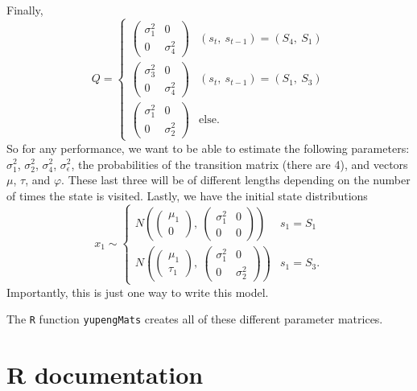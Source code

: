 \documentclass[11pt]{article}
\begin{document}
Finally, 
\[
Q=\begin{cases}\begin{pmatrix} \sigma^2_1 &
    0\\0&\sigma^2_4\end{pmatrix} & (s_t,\ s_{t-1})=(S_4,\ S_1)\\
                \begin{pmatrix} \sigma^2_3 &
                        0\\0&\sigma^2_4\end{pmatrix} & (s_t,\ s_{t-1})=(S_1,\ S_3)\\
\begin{pmatrix} \sigma^2_1 &
    0\\0&\sigma^2_2\end{pmatrix} & \textrm{else}.
\end{cases}
\] 
So for any performance, we want to be able to estimate
the following parameters: $\sigma_1^2$, $\sigma_2^2$, $\sigma^2_4$,
$\sigma_\epsilon^2$, the probabilities of the transition matrix (there
are 4), and vectors $\mu$, $\tau$, and $\varphi$. These last three
will be of different lengths depending on the number of times the
state is visited. Lastly, we have the initial state distributions
\[
x_1\sim\begin{cases} N\left( \begin{pmatrix}\mu_1\\0\end{pmatrix}
  ,\ \begin{pmatrix} \sigma^2_1 & 0\\0 & 0
  \end{pmatrix}\right) & s_1=S_1\\
N\left( \begin{pmatrix}\mu_1\\\tau_1\end{pmatrix}
  ,\ \begin{pmatrix} \sigma^2_1 & 0\\0 & \sigma^2_2
  \end{pmatrix}\right) & s_1=S_3.\end{cases}
\]
Importantly, this is just one way to write this
model.

The \texttt{R} function
\texttt{yupengMats} creates all of these different parameter matrices.


\section{R documentation}
\end{document}
